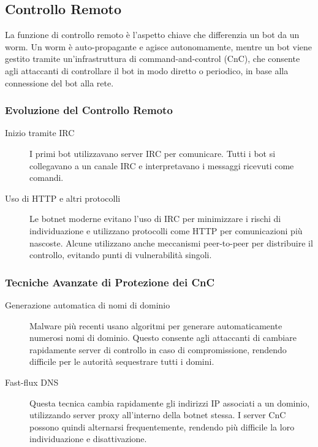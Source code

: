 \subsection{Controllo Remoto}

La funzione di controllo remoto è l'aspetto chiave che differenzia un bot da un worm. Un worm è auto-propagante e agisce autonomamente, mentre un bot viene gestito tramite un'infrastruttura di command-and-control (CnC), che consente agli attaccanti di controllare il bot in modo diretto o periodico, in base alla connessione del bot alla rete.

\subsubsection{Evoluzione del Controllo Remoto}

\begin{description}
    \item[Inizio tramite IRC] I primi bot utilizzavano server IRC per comunicare. Tutti i bot si collegavano a un canale IRC e interpretavano i messaggi ricevuti come comandi.
    
    \item[Uso di HTTP e altri protocolli] Le botnet moderne evitano l'uso di IRC per minimizzare i rischi di individuazione e utilizzano protocolli come HTTP per comunicazioni più nascoste. Alcune utilizzano anche meccanismi peer-to-peer per distribuire il controllo, evitando punti di vulnerabilità singoli.
\end{description}

\subsubsection{Tecniche Avanzate di Protezione dei CnC}

\begin{description}
    \item[Generazione automatica di nomi di dominio] Malware più recenti usano algoritmi per generare automaticamente numerosi nomi di dominio. Questo consente agli attaccanti di cambiare rapidamente server di controllo in caso di compromissione, rendendo difficile per le autorità sequestrare tutti i domini.
    
    \item[Fast-flux DNS] Questa tecnica cambia rapidamente gli indirizzi IP associati a un dominio, utilizzando server proxy all'interno della botnet stessa. I server CnC possono quindi alternarsi frequentemente, rendendo più difficile la loro individuazione e disattivazione.
\end{description}


